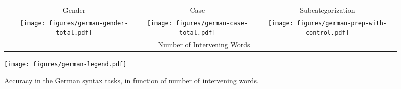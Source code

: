 

\begin{figure*}
	\begin{tabular}{cccc}
		& Gender & Case & Subcategorization \\ 
		\raisebox{1.7\height}{\rotatebox[origin=c]{90}{Accuracy}}
		&
\texttt{[image: figures/german-gender-total.pdf]} 
		&
		\texttt{[image: figures/german-case-total.pdf]}
		&
\texttt{[image: figures/german-prep-with-control.pdf]} \\ 
		&\multicolumn{3}{c}{Number of Intervening Words}
	\end{tabular}
\centering\texttt{[image: figures/german-legend.pdf]}
\caption{Accuracy in the German syntax tasks, in function of number of intervening words.}\label{fig:german-syntax}
\end{figure*}



